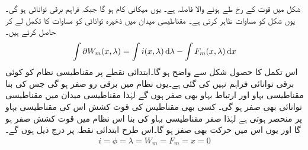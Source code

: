شکل   میں قوت   کے رخ طے ہونے والا فاصلہ  ہے۔ یوں  میکانی کام  ہو گا جبکہ  فراہم برقی توانائی  ہو گی۔ یوں شکل    کو مساوات   ظاہر کرتی ہے۔ مقناطیسی میدان میں ذخیرہ توانائی  کو مساوات   کا تکمل  لے کر حاصل کرتے ہیں۔
\begin{align}\label{مساوات_تبادلہ_توانائی_تکمل}
\int \partial W_m(x,\lambda) = \int i(x,\lambda) \dif \lambda-\int F_m(x,\lambda) \dif x
\end{align}
اس تکمل کا حصول شکل    سے واضح ہو گا۔ابتدائی نقطے پر مقناطیسی نظام کو کوئی برقی توانائی فراہم نہیں کی گئی ہے۔یوں نظام میں  برقی رو صفر ہو گی جس کی بنا  مقناطیسی بہاو اور  ارتباط بہاو بھی صفر ہوں گے  لہٰذا  مقناطیسی میدان میں مقناطیسی توانائی بھی صفر ہو گی۔ کسی بھی مقناطیس کی قوت کشش اس کی مقناطیسی بہاو پر منحصر ہوتی ہے لہٰذا صفر مقناطیسی بہاو کی بنا اس نظام میں قوت کشش صفر ہو گا اور یوں اس میں حرکت بھی صفر ہو گا۔اس طرح ابتدائی نقطہ پر درج ذیل ہوں گے۔
\begin{align*}
i=\phi=\lambda=W_m=F_m=x=0
\end{align*}

